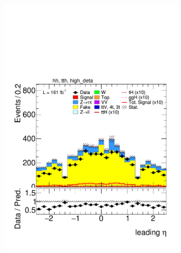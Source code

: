 \begin{figure}[htbp]
\begin{subfigure}[b]{0.45\textwidth}
        \includegraphics[width=\textwidth]{images/highdeta_highdeta_run3/plot_tau_0_eta_hh_tth_22_23_24_high_deta.pdf}
        \caption{}
      \end{subfigure}
  

\end{figure}
